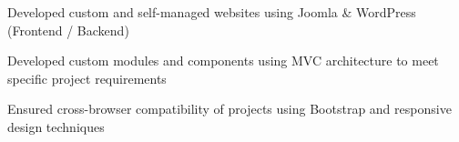 \documentclass[]{deedy-resume-openfont}
\begin{document}
\sectionsep
{}
\sectionsep
%
%
\newpage
{}\hfill {}
\begin{tightemize}
	\item Developed custom and self-managed websites using Joomla \& WordPress (Frontend / Backend)
	\item Developed custom modules and components using MVC architecture to meet specific project requirements
	\item Ensured cross-browser compatibility of projects using Bootstrap and responsive design techniques
\end{tightemize}
\sectionsep
{}
\sectionsep
%
%
\end{document}

